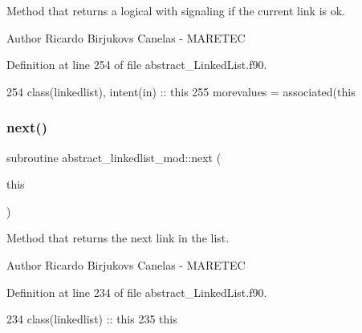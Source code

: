 Method that returns a logical with signaling if the current link is ok. 

\begin{DoxyAuthor}{Author}
Ricardo Birjukovs Canelas -\/ M\+A\+R\+E\+T\+EC 
\end{DoxyAuthor}


Definition at line 254 of file abstract\+\_\+\+Linked\+List.\+f90.


\begin{DoxyCode}
254     \textcolor{keywordtype}{class}(linkedlist), \textcolor{keywordtype}{intent(in)} :: this
255     morevalues = \textcolor{keyword}{associated}(this%
\end{DoxyCode}
\mbox{\label{namespaceabstract__linkedlist__mod_a576f148096561712d6ddd8c848bc7c4b}} 
\subsubsection{\texorpdfstring{next()}{next()}}
{\footnotesize\ttfamily subroutine abstract\+\_\+linkedlist\+\_\+mod\+::next (\begin{DoxyParamCaption}\item[{class(\mbox{\hyperlink{structabstract__linkedlist__mod_1_1linkedlist}{linkedlist}})}]{this }\end{DoxyParamCaption})\hspace{0.3cm}{\ttfamily [private]}}



Method that returns the next link in the list. 

\begin{DoxyAuthor}{Author}
Ricardo Birjukovs Canelas -\/ M\+A\+R\+E\+T\+EC 
\end{DoxyAuthor}


Definition at line 234 of file abstract\+\_\+\+Linked\+List.\+f90.


\begin{DoxyCode}
234     \textcolor{keywordtype}{class}(linkedlist) :: this
235     this%
\end{DoxyCode}
\mbox{\label{namespaceabstract__linkedlist__mod_a0b36d862899c5a40cb98bef4ffd5e2f4}} 
